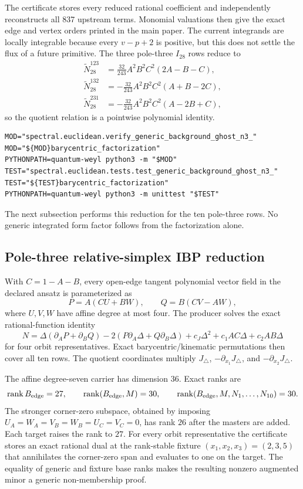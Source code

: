 \documentclass[11pt]{article}
\theoremstyle{definition}
\theoremstyle{remark}
\begin{document}
The certificate stores every reduced rational coefficient and independently
reconstructs all 837 upstream terms.  Monomial valuations then give the exact
edge and vertex orders printed in the main paper.  The current integrands are
locally integrable because every $v-p+2$ is positive, but this does not settle
the flux of a future primitive.  The three pole-three $I_{28}$ rows reduce to
\[
\begin{aligned}
 \widetilde N_{28}^{123}&=\frac{32}{243}A^2B^2C^2(2A-B-C),\\
 \widetilde N_{28}^{132}&=-\frac{32}{243}A^2B^2C^2(A+B-2C),\\
 \widetilde N_{28}^{231}&=-\frac{32}{243}A^2B^2C^2(A-2B+C),
\end{aligned}
\]
so the quotient relation is a pointwise polynomial identity.

\begin{verbatim}
MOD="spectral.euclidean.verify_generic_background_ghost_n3_"
MOD="${MOD}barycentric_factorization"
PYTHONPATH=quantum-weyl python3 -m "$MOD"
TEST="spectral.euclidean.tests.test_generic_background_ghost_n3_"
TEST="${TEST}barycentric_factorization"
PYTHONPATH=quantum-weyl python3 -m unittest "$TEST"
\end{verbatim}

The next subsection performs this reduction for the ten pole-three rows.  No
generic integrated form factor follows from the factorization alone.

\subsection{Pole-three relative-simplex IBP reduction}

With $C=1-A-B$, every open-edge tangent polynomial vector field in the
declared ansatz is parameterized as
\[
 P=A(CU+BW),\qquad Q=B(CV-AW),
\]
where $U,V,W$ have affine degree at most four.  The producer solves the exact
rational-function identity
\[
 N=\Delta(\partial_AP+\partial_BQ)
 -2(P\partial_A\Delta+Q\partial_B\Delta)
 +c_J\Delta^2+c_1AC\Delta+c_2AB\Delta
\]
for four orbit representatives.  Exact barycentric/kinematic permutations
then cover all ten rows.  The quotient coordinates multiply
$J_\triangle$, $-\partial_{x_1}J_\triangle$, and
$-\partial_{x_2}J_\triangle$.

The affine degree-seven carrier has dimension $36$.  Exact ranks are
\[
 \operatorname{rank}B_{\rm edge}=27,
 \qquad
 \operatorname{rank}(B_{\rm edge},M)=30,
 \qquad
 \operatorname{rank}(B_{\rm edge},M,N_1,\ldots,N_{10})=30.
\]
The stronger corner-zero subspace, obtained by imposing
$U_A=W_A=V_B=W_B=U_C=V_C=0$, has rank $26$ after the masters are added.
Each target raises the rank to $27$.  For every orbit representative the
certificate stores an exact rational dual at the rank-stable fixture
$(x_1,x_2,x_3)=(2,3,5)$ that annihilates the corner-zero span and evaluates
to one on the target.  The equality of generic and fixture base ranks makes
the resulting nonzero augmented minor a generic non-membership proof.
\end{document}

